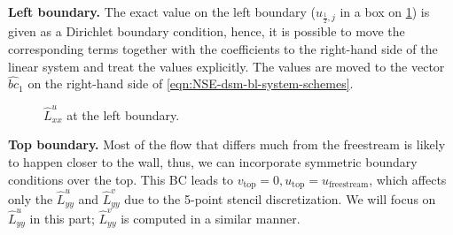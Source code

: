 \documentclass{article}
\begin{document}
\textbf{Left boundary.} 
The exact value on the left boundary ($u_{\frac{1}{2},j}$ in a box on \cref{fig:luxx-left}) is given as a Dirichlet boundary condition, hence, it is possible to move the corresponding terms together with the coefficients to the right-hand side of the linear system and treat the values explicitly. The values are moved to the vector $\hat{bc}_1$ on the right-hand side of \cref{eqn:NSE-dsm-bl-system-schemes}.
\begin{figure}[H] %
  \caption{$\hat{L}^u_{xx}$ at the left boundary.}\label{fig:luxx-left}
\end{figure}

\textbf{Top boundary.} Most of the flow that differs much from the freestream is likely to happen closer to the wall, thus, we can incorporate symmetric boundary conditions over the top. This BC leads to $v_{\text{top}}=0, u_{\text{top}}=u_{\text{freestream}}$, which affects only the $\hat{L}^u_{yy}$ and $\hat{L}^v_{yy}$ due to the 5-point stencil discretization. We will focus on $\hat{L}^u_{yy}$ in this part; $\hat{L}^v_{yy}$ is computed in a similar manner. 
\end{document}
